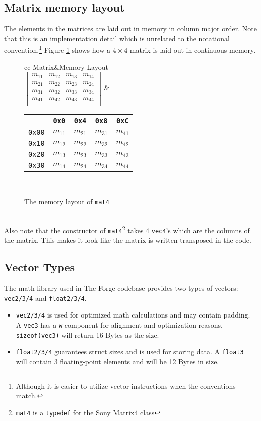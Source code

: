 \documentclass{article}
\newcommand{\BuildMat}[1]{\left[\begin{matrix}#1\end{matrix}\right]}
\let\lstInline\lstinline %
\newcommand{\InlCode}[1]{\lstInline[basicstyle=\ttfamily]{#1}}
\begin{document}
\subsection{Matrix memory layout}
The elements in the matrices are laid out in memory in column major order.
Note that this is an implementation detail which is unrelated to the notational convention.\footnote{Although it is easier to utilize vector instructions when the conventions match.}
Figure \ref{tabular:mat4MemoryLayout} shows how a $4\times 4$ matrix is laid out in continuous memory.\\
\begin{figure}[b]
\centering
\begin{tabular}{cc}
Matrix&Memory Layout\\
$
\BuildMat{
m_{11}&m_{12}&m_{13}&m_{14}\\
m_{21}&m_{22}&m_{23}&m_{24}\\
m_{31}&m_{32}&m_{33}&m_{34}\\
m_{41}&m_{42}&m_{43}&m_{44}\\
}
$
&
\begin{tabular}{|c|c|c|c|c|}
\hline
&\texttt{0x0}&\texttt{0x4}&\texttt{0x8}&\texttt{0xC}\\
\hline
\texttt{0x00}&$m_{11}$&$m_{21}$&$m_{31}$&$m_{41}$\\
\hline
\texttt{0x10}&$m_{12}$&$m_{22}$&$m_{32}$&$m_{42}$\\
\hline
\texttt{0x20}&$m_{13}$&$m_{23}$&$m_{33}$&$m_{43}$\\
\hline
\texttt{0x30}&$m_{14}$&$m_{24}$&$m_{34}$&$m_{44}$\\
\hline
\end{tabular}
\\
\end{tabular}
\caption{The memory layout of \InlCode{mat4}}
\label{tabular:mat4MemoryLayout}
\end{figure}
\\Also note that the constructor of \InlCode{mat4}\footnote{\InlCode{mat4} is a \InlCode{typedef} for the Sony Matrix4 class} takes 4 \InlCode{vec4}'s which are the columns of the matrix.
This makes it look like the matrix is written transposed in the code.

\subsection{Vector Types}
The math library used in The Forge codebase provides two types of vectors: \InlCode{vec2/3/4} and \InlCode{float2/3/4}.
\begin{itemize}
	\item \InlCode{vec2/3/4} is used for optimized math calculations and may contain padding. A \InlCode{vec3} has a \InlCode{w} component for alignment and optimization reasons, \InlCode{sizeof(vec3)} will return 16 Bytes as the size.
	\item \InlCode{float2/3/4} guarantees struct sizes and is used for storing data. A \InlCode{float3} will contain 3 floating-point elements and will be 12 Bytes in size.
\end{itemize}
\end{document}
